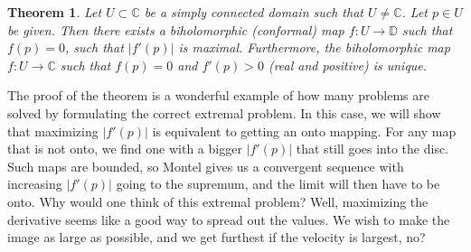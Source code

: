 \documentclass[12pt,openany]{book}
\newcommand{\sabs}[1]{\lvert {#1} \rvert}
\newcommand{\C}{{\mathbb{C}}}
\newcommand{\D}{{\mathbb{D}}}
\theoremstyle{plain}
\newtheorem{thm}{Theorem}[section]
\theoremstyle{remark}
\theoremstyle{definition}
\theoremstyle{exercise}
\theoremstyle{example}
\begin{document}
\begin{thm}
Let $U \subset \C$ be a simply connected domain such that $U \not= \C$.
Let $p \in U$ be given.  Then there exists a biholomorphic (conformal)
map $f \colon U \to \D$ such that $f(p) = 0$, such that $\sabs{f'(p)}$ is
maximal.  Furthermore, the biholomorphic map $f \colon U \to \C$
such that $f(p) = 0$ and
$f'(p) > 0$ (real and positive) is unique.
\end{thm}

The proof of the theorem is a wonderful example of how many problems are
solved by formulating the correct extremal problem.  In this case, we will
show that maximizing $\sabs{f'(p)}$ is equivalent to getting an onto
mapping.  For any map that is not onto, we find one with a bigger
$\sabs{f'(p)}$ that still goes into the disc.  Such maps are bounded,
so Montel gives us a convergent sequence with increasing $\sabs{f'(p)}$
going to the supremum, and the limit will then have to be onto.
Why would one think of this extremal problem?  Well,
maximizing the derivative seems like a good way to spread out the values.
We wish to make the image as large as possible, and we get furthest if the
velocity is largest, no?
\end{document}
